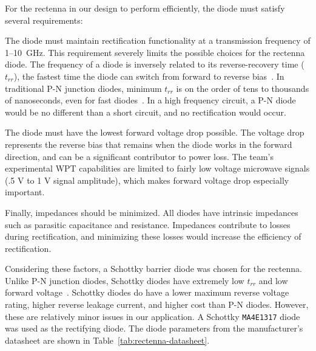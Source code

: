 For the rectenna in our design to perform efficiently, the diode must satisfy several requirements:

The diode must maintain rectification functionality at a transmission frequency of \numrange{1}{10}~GHz. This requirement severely limits the possible choices for the rectenna diode. The frequency of a diode is inversely related to its reverse-recovery time ($t_{rr}$), the fastest time the diode can switch from forward to reverse bias~\cite{an1012-TRR}. In traditional P-N junction diodes, minimum $t_{rr}$ is on the order of tens to thousands of nanoseconds, even for fast diodes~\cite{davis2011schottky}. In a high frequency circuit, a P-N diode would be no different than a short circuit, and no rectification would occur.

The diode must have the lowest forward voltage drop possible. The voltage drop represents the reverse bias that remains when the diode works in the forward direction, and can be a significant contributor to power loss. The team's experimental WPT capabilities are limited to fairly low voltage microwave signals (.5 V to 1 V signal amplitude), which makes forward voltage drop especially important.

Finally, impedances should be minimized. All diodes have intrinsic impedances such as parasitic capacitance and resistance. Impedances contribute to losses during rectification, and minimizing these losses would increase the efficiency of rectification.

Considering these factors, a Schottky barrier diode was chosen for the rectenna. Unlike P-N junction diodes, Schottky diodes have extremely low $t_{rr}$ and low forward voltage~\cite{davis2011schottky}.  Schottky diodes do have a lower maximum reverse voltage rating, higher reverse leakage current, and higher cost than P-N diodes. However, these are relatively minor issues in our application. A Schottky \texttt{MA4E1317} diode was used as the rectifying diode. The diode parameters from the manufacturer's datasheet are shown in Table~\ref{tab:rectenna-datasheet}.

